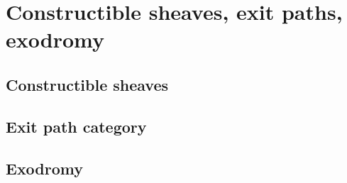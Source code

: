 \chapter{Constructible sheaves, exit paths, exodromy}
\label{lecture:19}

\section{Constructible sheaves}

\section{Exit path category}

\section{Exodromy}

